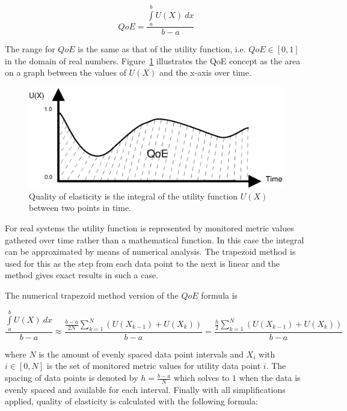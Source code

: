 \documentclass[english]{tktltiki2}
\theoremstyle{definition}
\theoremstyle{remark}
\begin{document}
\begin{equation}
QoE = \frac{\int\limits_a^b U(X)~dx}{b-a} \label{eq:qoefunction}
\end{equation}

The range for $QoE$ is the same as that of the utility function, i.e. $QoE \in [0, 1]$ in the domain of real numbers. Figure~\ref{fig:utility-qoe} illustrates the QoE concept as the area on a graph between the values of $U(X)$ and the x-axis over time.

\begin{figure}[h!]
	\includegraphics[width=\textwidth]{images/utility-qoe}
	\caption{Quality of elasticity is the integral of the utility function $U(X)$ 
	between two points in time.}
	\label{fig:utility-qoe}
\end{figure}


For real systems the utility function is represented by monitored metric values
gathered over time rather than a mathematical function. In this case the
integral can be approximated by means of numerical analysis. The trapezoid
method \cite{stewart2010calculus} is used for this as the step from each data
point to the next is linear and the method gives exact results in such a case.

The numerical trapezoid method version of the $QoE$ formula is

\begin{equation}
\frac{\int\limits_a^b U(X)~dx}{b-a} \approx 
\frac{\frac{b-a}{2N}\sum\limits_{k=1}^N (U(X_{k-1}) + U(X_{k}))}{b-a} = 
\frac{\frac{h}{2}\sum\limits_{k=1}^N (U(X_{k-1}) + U(X_{k}))}{b-a} 
\label{eq:qoefunctionnumerical}
\end{equation}

where $N$ is the amount of evenly spaced data point intervals and $X_{i}$ with
$i \in [0, N]$ is the set of monitored metric values for utility data
point $i$. The spacing of data points is denoted by $h = \frac{b-a}{N}$ which
solves to $1$ when the data is evenly spaced and available for each interval.
Finally with all simplifications applied, quality of elasticity is calculated
with the following formula:
\end{document}
